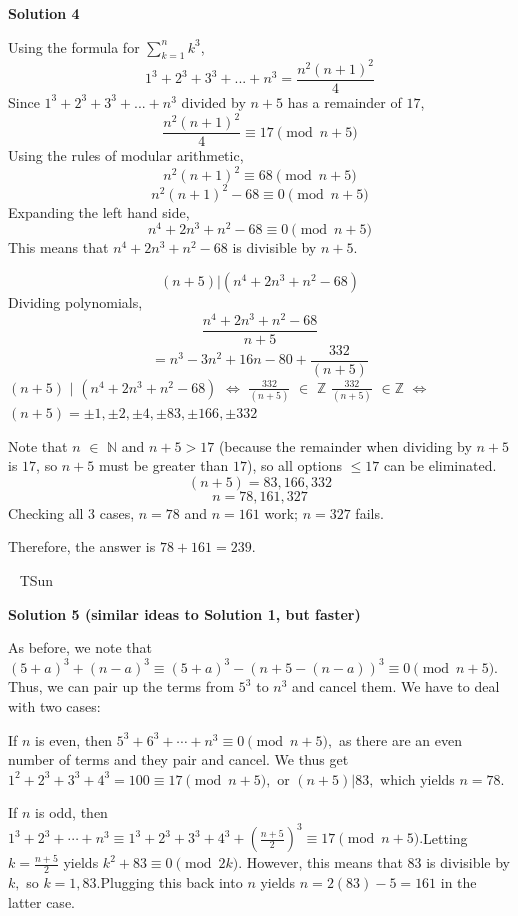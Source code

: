 \begin{enumerate}
 



\textbf{Solution 4}

Using the formula for  $\sum_{k=1}^n  k^3$,
 \[1^3 + 2^3 + 3^3 + ... + n^3 = \frac{n^2(n+1)^2}{4}\]Since $1^3 + 2^3 + 3^3 + ... + n^3$ divided by $n + 5$ has a remainder of $17$,
 \[\frac{n^2(n+1)^2}{4} \equiv 17\pmod {n + 5}\]Using the rules of modular arithmetic,
 \[n^2(n+1)^2 \equiv 68\pmod {n + 5}\]
 \[n^2(n+1)^2 - 68\equiv 0\pmod {n + 5}\]Expanding the left hand side,
 \[n^4 + 2 n^3 + n^2 - 68\equiv 0\pmod {n + 5}\]This means that $n^4 + 2 n^3 + n^2 - 68$ is divisible by ${n + 5}$.

 
 \[(n + 5) | (n^4 + 2 n^3 + n^2 - 68)\]Dividing polynomials,
 \[\frac{n^4 + 2 n^3 + n^2 - 68}{n + 5}\]
 \[= n^3 - 3 n^2 + 16n - 80 + \frac{332}{(n + 5)}\]$(n + 5)$ $|$ $(n^4 + 2 n^3 + n^2 - 68)$ $\iff$ $\frac{332}{(n + 5)}$ $\in$ $\mathbb{Z}$
$\frac{332}{(n + 5)}$ $\in$$\mathbb{Z}$ $\iff$ $(n + 5) = \pm 1, \pm 2, \pm 4, \pm 83, \pm 166, \pm 332$

Note that $n$ $\in$ $\mathbb{N}$ and $n + 5 > 17$ (because the remainder when dividing by $n + 5$ is $17$, so $n + 5$ must be greater than $17$), so all options $\leq 17$ can be eliminated.
 \[(n + 5) = 83, 166, 332\]
 \[n = 78, 161, 327\]Checking all 3 cases, $n = 78$ and $n = 161$ work; $n = 327$ fails.

Therefore, the answer is $78 + 161 = \boxed{239}$.

~ {TSun} ~

 



\textbf{Solution 5 (similar ideas to Solution 1, but faster)}

As before, we note that $(5+a)^3 + (n-a)^3 \equiv (5+a)^3 - (n+5 - (n-a))^3 \equiv 0 \pmod {n+5}.$Thus, we can pair up the terms from $5^3$ to $n^3$ and cancel them. We have to deal with two cases:

 If $n$ is even, then $5^3+6^3 + \cdots + n^3 \equiv 0 \pmod {n+5},$ as there are an even number of terms and they pair and cancel. We thus get $1^2+2^3+3^3+4^3 = 100 \equiv 17 \pmod {n+5},$ or $(n+5) | 83,$ which yields $n=78.$

 If $n$ is odd, then $1^3+2^3+\cdots + n^3 \equiv 1^3+2^3+3^3+4^3+\left( \frac{n+5}{2} \right)^3 \equiv 17 \pmod {n+5}.$Letting $k = \frac{n+5}{2}$ yields $k^2 + 83 \equiv 0 \pmod {2k}.$ However, this means that $83$ is divisible by $k,$ so $k=1,83.$Plugging this back into $n$ yields $n=2(83)-5 = 161$ in the latter case.


\end{enumerate}
